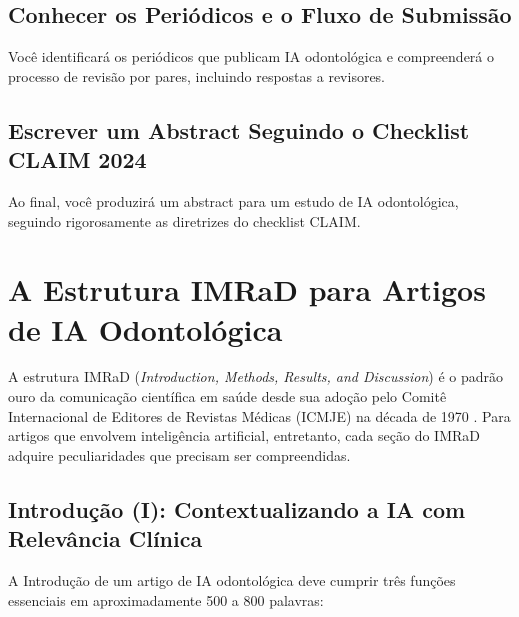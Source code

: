 \subsection{Conhecer os Periódicos e o Fluxo de Submissão}
Você identificará os periódicos que publicam IA odontológica e compreenderá o processo de revisão por pares, incluindo respostas a revisores.

\subsection{Escrever um Abstract Seguindo o Checklist CLAIM 2024}
Ao final, você produzirá um abstract para um estudo de IA odontológica, seguindo rigorosamente as diretrizes do checklist CLAIM.

\section{A Estrutura IMRaD para Artigos de IA Odontológica}
\label{sec:imrad-ia}

\nivelquatro

A estrutura IMRaD (\textit{Introduction, Methods, Results, and Discussion}) é o
padrão ouro da comunicação científica em saúde desde sua adoção pelo Comitê
Internacional de Editores de Revistas Médicas (ICMJE) na década de 1970
\cite{icmje2024recommendations}. Para artigos que envolvem inteligência
artificial, entretanto, cada seção do IMRaD adquire peculiaridades que precisam
ser compreendidas.

\subsection{Introdução (I): Contextualizando a IA com Relevância Clínica}

A Introdução de um artigo de IA odontológica deve cumprir três funções
essenciais em aproximadamente 500 a 800 palavras:

